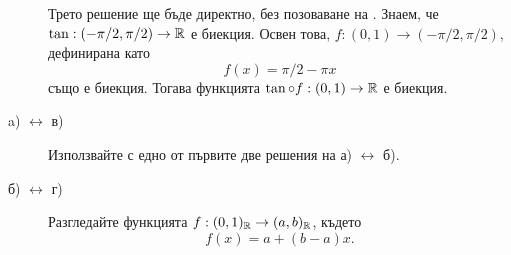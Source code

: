 \begin{hint}
\begin{description}
    Трето решение ще бъде директно, без позоваване на .
    Знаем, че $\tan: (-\pi/2,\pi/2) \to \mathbb{R}$ е биекция.
    Освен това, $f: (0,1) \to (-\pi/2,\pi/2)$, дефинирана като
    \[f(x) = \pi/2 - \pi x\] също е биекция.
    Тогава функцията $\tan\circ f : (0,1) \to \mathbb{R}$ е биекция.    
    
  \item[a) $\leftrightarrow$ в)]
    Използвайте  с едно от първите две решения на а) $\leftrightarrow$ б).
  \item[б) $\leftrightarrow$ г)]
    Разгледайте функцията $f: (0,1)_{\mathbb{R}} \to (a,b)_{\mathbb{R}}$, където
    \[f(x) = a + (b-a)x.\]
  \end{description}
\end{hint}


